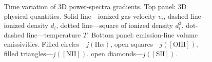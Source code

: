 \documentclass[useAMS,usenatbib]{mn2e}
\newcounter{ionstage} %
\newcommand{\ion}[2]{\setcounter{ionstage}{#2}%
  \ensuremath{\mathrm{#1\,\scriptstyle\Roman{ionstage}}}} %
\newcommand\oiii{[\ion{O}{3}]} %
\providecommand{\DIFadd}[1]{{\protect\color{red!70!black}#1}} %
\providecommand{\DIFdel}[1]{} %
\providecommand{\DIFdelbegin}{} %
\providecommand{\DIFaddFL}[1]{\DIFadd{#1}} %
\providecommand{\DIFdelFL}[1]{} %
\providecommand{\DIFaddbeginFL}{} %
\providecommand{\DIFaddendFL}{} %
\providecommand{\DIFdelbeginFL}{} %
\providecommand{\DIFdelendFL}{} %
\begin{document}
\begin{figure}
\DIFaddendFL \caption{Time variation of \DIFdelbeginFL \DIFdelFL{power spectrum gradient for }\DIFdelendFL 3D \DIFaddbeginFL \DIFaddFL{power-spectra gradients. Top panel: 3D }\DIFaddendFL physical
  quantities. \DIFdelbeginFL \DIFdelFL{Dashed line: square of ionized density $d_i^2$}\DIFdelendFL \DIFaddbeginFL \DIFaddFL{Solid line---ionized
  gas velocity $v_i$}\DIFaddendFL , \DIFdelbeginFL \DIFdelFL{dot-dashed line: ionized }\DIFdelendFL \DIFaddbeginFL \DIFaddFL{dashed line---ionized }\DIFaddendFL density $d_i$, \DIFdelbeginFL \DIFdelFL{short-dashed line: }\DIFdelendFL \DIFaddbeginFL \DIFaddFL{dotted line---square of }\DIFaddendFL ionized \DIFdelbeginFL \DIFdelFL{gas velocity $v_i$}\DIFdelendFL \DIFaddbeginFL \DIFaddFL{density $d_i^2$}\DIFaddendFL ,
  \DIFdelbeginFL \DIFdelFL{dotted line: temperature }\DIFdelendFL \DIFaddbeginFL \DIFaddFL{dot-dashed line---temperature }\DIFaddendFL $T$. \DIFdelbeginFL \DIFdelFL{Filled circles}\DIFdelendFL \DIFaddbeginFL \DIFaddFL{Bottom panel}\DIFaddendFL : \DIFdelbeginFL \DIFdelFL{H$\alpha$ emissivity in 3D }\DIFdelendFL \DIFaddbeginFL \DIFaddFL{emission-line
  volume emissivities. Filled circles---}\DIFaddendFL $j(\mathrm{H}\alpha)$, open
  \DIFdelbeginFL \DIFdelFL{squares:
  }%
\DIFdelFL{$\lambda$5007 emissivity in 3D }\DIFdelendFL \DIFaddbeginFL \DIFaddFL{squares---}\DIFaddendFL $j(\mathrm{[OIII]})$\DIFaddbeginFL \DIFaddFL{, filled
  triangles---$j(\mathrm{[NII]})$}\DIFaddendFL . \DIFaddbeginFL \DIFaddFL{open diamonds---$j(\mathrm{[SII]})$.}\DIFaddendFL }
\label{fig:psevol}
\end{figure}
\DIFdelbegin %
{%
\DIFdel{Power-law indices for the 3D velocity, density and weighted
  velocity spectra.}}
\DIFdel{Time}%
\DIFdel{$n(v_i)$ }%
\DIFdel{$n(d_i)$ }%
\DIFdel{$n(v_i d_i^{1/3})$}%
\DIFdel{150,000 }%
\DIFdel{-3.23 }%
\DIFdel{-3.22 }%
\DIFdel{-3.17 }%
\DIFdel{200,000 }%
\DIFdel{-3.06 }%
\DIFdel{-3.12 }%
\DIFdel{-3.09 }%
\DIFdel{250,000 }%
\end{document}
